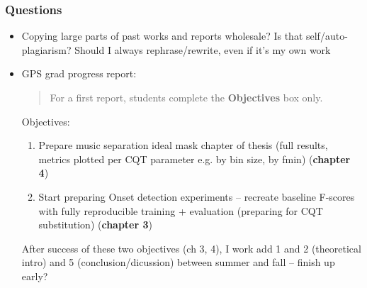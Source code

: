 \documentclass[usenames,dvipsnames]{beamer}
\begin{document}
\begin{frame}
	\frametitle{Questions}
	\begin{itemize}
		\item
			Copying large parts of past works and reports wholesale? Is that self/auto-plagiarism? Should I always rephrase/rewrite, even if it's my own work
		\item
			GPS grad progress report:\\
			\begin{quote}
			For a first report, students complete the \textbf{Objectives} box only.
			\end{quote}
			Objectives:
			\begin{enumerate}
				\item
					Prepare music separation ideal mask chapter of thesis (full results, metrics plotted per CQT parameter e.g. by bin size, by fmin) (\textbf{chapter 4})
				\item
					Start preparing Onset detection experiments -- recreate baseline F-scores with fully reproducible training + evaluation (preparing for CQT substitution) (\textbf{chapter 3})
			\end{enumerate}
			After success of these two objectives (ch 3, 4), I work add 1 and 2 (theoretical intro) and 5 (conclusion/dicussion) between summer and fall -- finish up early?
	\end{itemize}
\end{frame}
\end{document}
